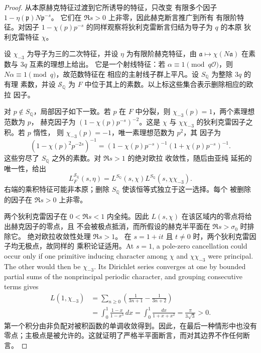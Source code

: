 \documentclass[11pt,a4paper]{article}
\numberwithin{equation}{section}
\numberwithin{figure}{section}
\theoremstyle{definition}
\theoremstyle{remark}
\begin{document}
\begin{proof}
从本原赫克特征过渡到它所诱导的特征，只改变
有限多个因子 $1-\eta(\mathfrak p)N\mathfrak p^{-s}$。
它们在 $\Re s>0$ 上非零，因此赫克断言推广到所有
有限阶特征。对因子
$1-\chi(p)p^{-s}$ 的同样观察将狄利克雷断言归结为导子为 $q$ 的本原
狄利克雷特征 $\chi$。

设 $\chi_{-3}$ 为导子为三的二次特征，并设
$\eta$ 为有限阶赫克特征，由
$\mathfrak a\mapsto\chi(N\mathfrak a)$ 在素数与 $3q$ 互素的理想上给出。
它是一个射线特征：若 $\alpha\equiv1\pmod{q\mathcal O}$，则
$N\alpha\equiv1\pmod q$，故范数特征在
相应的主射线子群上平凡。设 $S_{\mathbb Q}$ 为整除 $3q$ 的有理
素数，并设 $\mathcal S_{\mathbb Q}$ 为 $F$ 中位于其上的素数。以上标这些集合表示删除相应的欧拉
因子。

对 $p\notin S_{\mathbb Q}$，局部因子如下一致。若 $p$
在 $F$ 中分裂，则 $\chi_{-3}(p)=1$，两个素理想范数为 $p$，
赫克因子为 $(1-\chi(p)p^{-s})^{-2}$。这是
$\chi$ 与 $\chi\chi_{-3}$ 的狄利克雷因子之积。若 $p$ 惰性，
则 $\chi_{-3}(p)=-1$，唯一素理想范数为 $p^2$，其
因子为
\[
 (1-\chi(p)^2p^{-2s})^{-1}
  =(1-\chi(p)p^{-s})^{-1}(1+\chi(p)p^{-s})^{-1}.
\]
这些穷尽了 $S_{\mathbb Q}$ 之外的素数。对 $\Re s>1$ 的绝对欧拉
收敛性，随后由亚纯
延拓的唯一性，给出
\begin{equation}
 L_F^{\mathcal S_{\mathbb Q}}(s,\eta)
 =L^{S_{\mathbb Q}}(s,\chi)
      L^{S_{\mathbb Q}}(s,\chi\chi_{-3}).
 \label{eq:hecke-dirichlet-factorization}
\end{equation}
右端的乘积特征可能非本原；删除
$S_{\mathbb Q}$ 使该恒等式独立于这一选择。每个
被删除的因子在 $\Re s>0$ 上非零。

两个狄利克雷因子在 $0<\Re s<1$ 内全纯。因此 $L(s,\chi)$ 在该区域内的零点将给出赫克因子的零点，且
不会被极点抵消，而所假设的赫克半平面在 $\Re s>\sigma_0$ 时排除它。
绝对欧拉收敛性处理 $\Re s>1$。
在 $s=1+it$ 且 $t\ne0$ 时，两个狄利克雷因子均无极点，故同样的
乘积论证适用。At $s=1$, a pole-zero cancellation could occur only if one primitive
inducing character among $\chi$ and $\chi\chi_{-3}$ were principal.  The
other would then be $\chi_{-3}$.  Its Dirichlet series converges at one
by bounded partial sums of the nonprincipal periodic character, and
grouping consecutive terms gives
\[
 \begin{split}
 L(1,\chi_{-3})
 &=\sum_{n\ge0}\left(\frac1{3n+1}-\frac1{3n+2}\right)\\
 &=\int_0^1\frac{1-x}{1-x^3}\,dx
   =\int_0^1\frac{dx}{1+x+x^2}
   =\frac{\pi}{3\sqrt3}>0.
 \end{split}
\]
第一个积分由非负配对被积函数的单调收敛得到。因此，在最后一种情形中也没有零点；主极点是被允许的。这就证明了严格半平面断言，而对其边界不作任何断言。
\end{proof}
\end{document}
